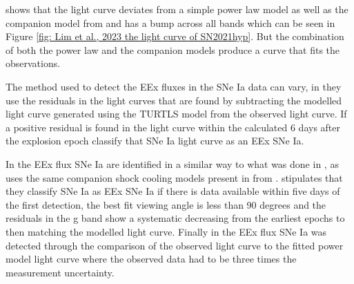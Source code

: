  \textcite{lim_early_2023} shows that the light curve deviates from a simple power law model as well as the companion model from \textcite{kasen_seeing_2010} and has a bump across all bands which can be seen in Figure \ref{fig: Lim et al., 2023 the light curve of SN2021hyp}. But the combination of both the power law and the \textcite{kasen_seeing_2010} companion models produce a curve that fits the observations. 

The method used to detect the EEx fluxes in the SNe Ia data can vary, in \textcite{deckers_constraining_2022} they use the residuals in the light curves that are found by subtracting the modelled light curve generated using the TURTLS model from the observed light curve. If a positive residual is found in the light curve within the calculated 6 days after the explosion epoch \textcite{deckers_constraining_2022} classify that SNe Ia light curve as an EEx SNe Ia. 

In \textcite{burke_early_2022} the EEx flux SNe Ia are identified in a similar way to what was done in \textcite{lim_early_2023}, as \textcite{burke_early_2022} uses the same companion shock cooling models present in \textcite{lim_early_2023} from \textcite{kasen_seeing_2010}. \textcite{burke_early_2022} stipulates that they classify SNe Ia as EEx SNe Ia if there is data available within five days of the first detection, the best fit viewing angle is less than 90 degrees and the residuals in the g band show a systematic decreasing from the earliest epochs to then matching the modelled light curve. Finally in \textcite{marion_sn2012cg_2016} the EEx flux SNe Ia was detected through the comparison of the observed light curve to the fitted power model light curve where the observed data had to be three times the measurement uncertainty. 
